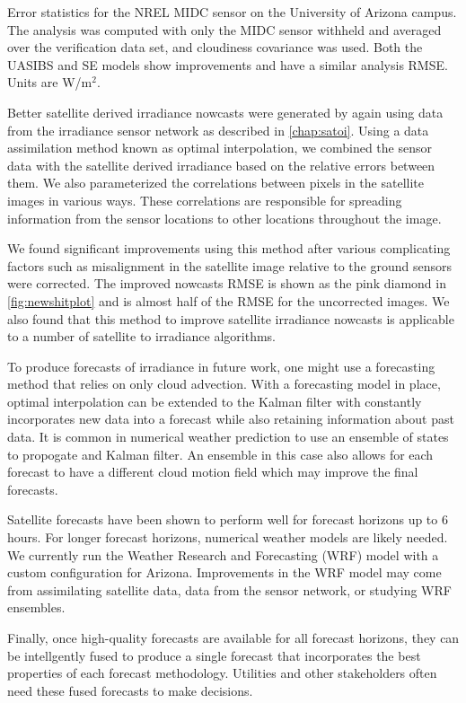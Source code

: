 \begin{table}[htbp]
  \caption{Error statistics for the NREL MIDC sensor on the University
    of Arizona campus. The analysis was computed with only the MIDC
    sensor withheld and averaged over the verification data set, and
    cloudiness covariance was used. Both the
    UASIBS and SE models show improvements and have a similar
    analysis RMSE\@. Units are W/m$^2$.}
\label{table:irr}
\vspace{0.5em}

\centering
\end{table}


Better satellite derived irradiance nowcasts were generated by again
using data from the irradiance sensor network as described in
\cref{chap:satoi}.
Using a data assimilation method known as optimal interpolation, we
combined the sensor data with the satellite derived irradiance based
on the relative errors between them.
We also parameterized the correlations between pixels in the satellite
images in various ways.
These correlations are responsible for spreading information from the
sensor locations to other locations throughout the image.

We found significant improvements using this method after various
complicating factors such as misalignment in the satellite image
relative to the ground sensors were corrected.
The improved nowcasts RMSE is shown as the pink diamond in
\cref{fig:newshitplot} and is almost half of the RMSE for the
uncorrected images.
We also found that this method to improve satellite irradiance
nowcasts is applicable to a number of satellite to irradiance
algorithms.

To produce forecasts of irradiance in future work, one might use a
forecasting method that relies on only cloud advection.
With a forecasting model in place, optimal interpolation can be
extended to the Kalman filter with constantly incorporates new data
into a forecast while also retaining information about past data.
It is common in numerical weather prediction to use an ensemble of
states to propogate and Kalman filter.
An ensemble in this case also allows for each forecast to have a
different cloud motion field which may improve the final forecasts.

Satellite forecasts have been shown to perform well for forecast
horizons up to 6 hours.
For longer forecast horizons, numerical weather models are likely
needed.
We currently run the Weather Research and Forecasting (WRF) model with
a custom configuration for Arizona.
Improvements in the WRF model may come from assimilating satellite
data, data from the sensor network, or studying WRF ensembles.


Finally, once high-quality forecasts are available for all forecast
horizons, they can be intellgently fused to produce a single forecast
that incorporates the best properties of each forecast methodology.
Utilities and other stakeholders often need these fused forecasts to
make decisions.





